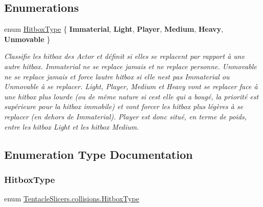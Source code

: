 \subsection*{Enumerations}
\begin{DoxyCompactItemize}
\item 
enum \hyperlink{namespace_tentacle_slicers_1_1collisions_aa7fd5cb9caf0a56384804b6bc00a6f0e}{Hitbox\+Type} \{ \newline
{\bfseries Immaterial}, 
{\bfseries Light}, 
{\bfseries Player}, 
{\bfseries Medium}, 
\newline
{\bfseries Heavy}, 
{\bfseries Unmovable}
 \}\begin{DoxyCompactList}\small\item\em Classifie les hitbox des Actor et définit si elles se replacent par rapport à une autre hitbox. Immaterial ne se replace jamais et ne replace personne. Unmovable ne se replace jamais et force l\textquotesingle{}autre hitbox si elle n\textquotesingle{}est pas Immaterial ou Unmovable à se replacer. Light, Player, Medium et Heavy vont se replacer face à une hitbox plus lourde (ou de même nature si c\textquotesingle{}est elle qui a bougé, la priorité est supérieure pour la hitbox immobile) et vont forcer les hitbox plus légères à se replacer (en dehors de Immaterial). Player est donc situé, en terme de poids, entre les hitbox Light et les hitbox Medium. \end{DoxyCompactList}
\end{DoxyCompactItemize}


\subsection{Enumeration Type Documentation}
\mbox{\label{namespace_tentacle_slicers_1_1collisions_aa7fd5cb9caf0a56384804b6bc00a6f0e}} 
\subsubsection{\texorpdfstring{Hitbox\+Type}{HitboxType}}
{\footnotesize\ttfamily enum \hyperlink{namespace_tentacle_slicers_1_1collisions_aa7fd5cb9caf0a56384804b6bc00a6f0e}{Tentacle\+Slicers.\+collisions.\+Hitbox\+Type}\hspace{0.3cm}{\ttfamily [strong]}}



